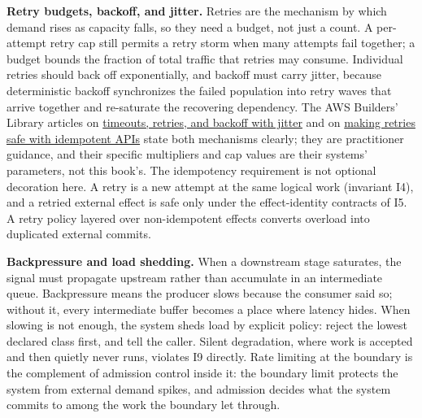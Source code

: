 \textbf{Retry budgets, backoff, and jitter.} Retries are the mechanism by which demand rises as capacity falls, so they need a budget, not just a count. A per-attempt retry cap still permits a retry storm when many attempts fail together; a budget bounds the fraction of total traffic that retries may consume. Individual retries should back off exponentially, and backoff must carry jitter, because deterministic backoff synchronizes the failed population into retry waves that arrive together and re-saturate the recovering dependency. The AWS Builders' Library articles on \href{https://aws.amazon.com/builders-library/timeouts-retries-and-backoff-with-jitter/}{timeouts, retries, and backoff with jitter} and on \href{https://aws.amazon.com/builders-library/making-retries-safe-with-idempotent-APIs/}{making retries safe with idempotent APIs} state both mechanisms clearly; they are practitioner guidance, and their specific multipliers and cap values are their systems' parameters, not this book's. The idempotency requirement is not optional decoration here. A retry is a new attempt at the same logical work (invariant I4), and a retried external effect is safe only under the effect-identity contracts of I5. A retry policy layered over non-idempotent effects converts overload into duplicated external commits.

\textbf{Backpressure and load shedding.} When a downstream stage saturates, the signal must propagate upstream rather than accumulate in an intermediate queue. Backpressure means the producer slows because the consumer said so; without it, every intermediate buffer becomes a place where latency hides. When slowing is not enough, the system sheds load by explicit policy: reject the lowest declared class first, and tell the caller. Silent degradation, where work is accepted and then quietly never runs, violates I9 directly. Rate limiting at the boundary is the complement of admission control inside it: the boundary limit protects the system from external demand spikes, and admission decides what the system commits to among the work the boundary let through.

